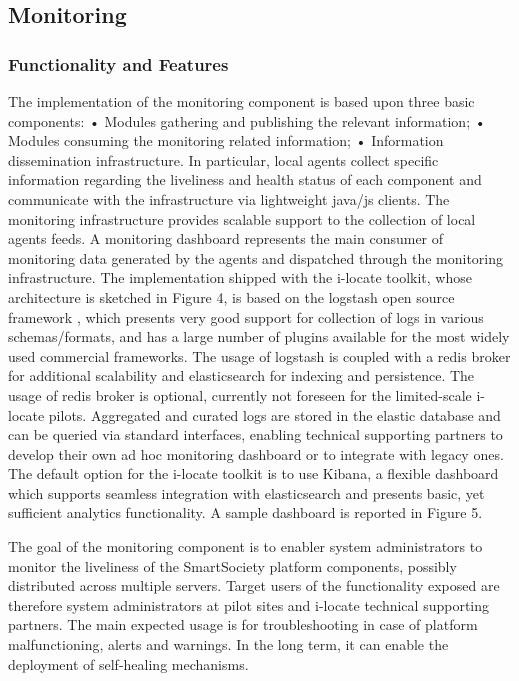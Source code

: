 \subsection{Monitoring}
\subsubsection{Functionality and Features}
The implementation of the monitoring component is based upon three basic components:
• Modules gathering and publishing the relevant information;
• Modules consuming the monitoring related information;
• Information dissemination infrastructure.
In particular, local agents collect specific information regarding the liveliness and health status of each component and communicate with the infrastructure via lightweight java/js clients. The monitoring infrastructure provides scalable support to the collection of local agents feeds. A monitoring dashboard represents the main consumer of monitoring data generated by the agents and dispatched through the monitoring infrastructure.
The implementation shipped with the i-locate toolkit, whose architecture is sketched in Figure 4, is based on the logstash open source framework , which presents very good support for collection of logs in various schemas/formats, and has a large number of plugins available for the most widely used commercial frameworks. The usage of logstash is coupled with a redis broker for additional scalability and elasticsearch for indexing and persistence. The usage of redis broker is optional, currently not foreseen for the limited-scale i-locate pilots.
Aggregated and curated logs are stored in the elastic database and can be queried via standard interfaces, enabling technical supporting partners to develop their own ad hoc monitoring dashboard or to integrate with legacy ones. The default option for the i-locate toolkit is to use Kibana, a flexible dashboard which supports seamless integration with elasticsearch and presents basic, yet sufficient analytics functionality. A sample dashboard is reported in Figure 5.

The goal of the monitoring component is to enabler system administrators to monitor the liveliness of the SmartSociety platform components, possibly distributed across multiple servers. Target users of the functionality exposed are therefore system administrators at pilot sites and i-locate technical supporting partners.
The main expected usage is for troubleshooting in case of platform malfunctioning, alerts and warnings. In the long term, it can enable the deployment of self-healing mechanisms.

